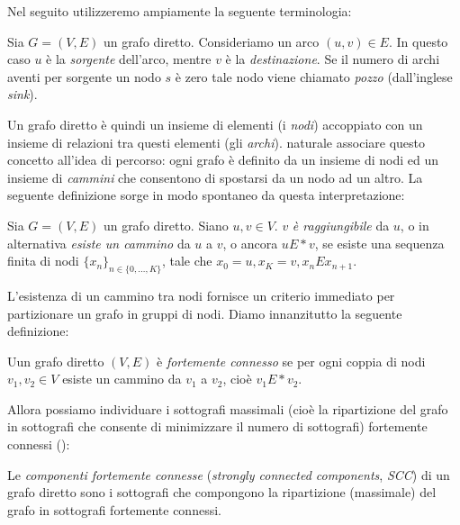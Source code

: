 Nel seguito utilizzeremo ampiamente la seguente terminologia:
\begin{definition}
    Sia $G = (V,E)$ un grafo diretto. Consideriamo un arco $(u,v) \in E$. In questo caso $u$ è la \emph{sorgente} dell'arco, mentre $v$ è la \emph{destinazione}. Se il numero di archi aventi per sorgente un nodo $s$ è zero tale nodo viene chiamato \emph{pozzo} (dall'inglese \emph{sink}).
\end{definition}
Un grafo diretto è quindi un insieme di elementi (i \emph{nodi}) accoppiato con un insieme di relazioni tra questi elementi (gli \emph{archi}). \accente naturale associare questo concetto all'idea di percorso: ogni grafo è definito da un insieme di nodi ed un insieme di \emph{cammini} che consentono di spostarsi da un nodo ad un altro. La seguente definizione sorge in modo spontaneo da questa interpretazione:
\begin{definition}
    Sia $G = (V, E)$ un grafo diretto. Siano $u,v \in V$. $v$ \emph{è raggiungibile} da $u$, o in alternativa \emph{esiste un cammino} da $u$ a $v$, o ancora $u E* v$, se esiste una sequenza finita di nodi $\displaystyle \{x_n\}_{n \in \{0,\dots,K\}}$, tale che $x_0 = u, x_K = v, x_n E x_{n+1}$.
\end{definition}
L'esistenza di un cammino tra nodi fornisce un criterio immediato per partizionare un grafo in gruppi di nodi. Diamo innanzitutto la seguente definizione:
\begin{definition}
    Uun grafo diretto $(V,E)$ è \emph{fortemente connesso} se per ogni coppia di nodi $v_1, v_2 \in V$ esiste un cammino da $v_1$ a $v_2$, cioè $v_1 E* v_2$.
\end{definition}
Allora possiamo individuare i sottografi massimali (cioè la ripartizione del grafo in sottografi che consente di minimizzare il numero di sottografi) fortemente connessi (\hspace*{-0.1cm}\cite[Appendice B]{clrs}):
\begin{definition}
    Le \emph{componenti fortemente connesse} (\emph{strongly connected components}, \emph{SCC}) di un grafo diretto sono i sottografi che compongono la ripartizione (massimale) del grafo in sottografi fortemente connessi.
\end{definition}
